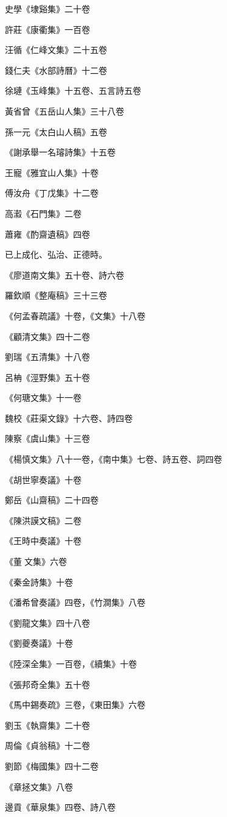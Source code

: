 史學《埭谿集》二十卷

許莊《康衢集》一百卷

汪循《仁峰文集》二十五卷

錢仁夫《水部詩曆》十二卷

徐璉《玉峰集》十五卷、五言詩五卷

黃省曾《五岳山人集》三十八卷

孫一元《太白山人稿》五卷

《謝承舉一名璿詩集》十五卷

王寵《雅宜山人集》十卷

傅汝舟《丁戊集》十二卷

高瀫《石門集》二卷

蕭雍《酌齋遺稿》四卷

已上成化、弘治、正德時。

《廖道南文集》五十卷、詩六卷

羅欽順《整庵稿》三十三卷

《何孟春疏議》十卷，《文集》十八卷

《顧清文集》四十二卷

劉瑞《五清集》十八卷

呂柟《涇野集》五十卷

《何瑭文集》十一卷

魏校《莊渠文錄》十六卷、詩四卷

陳察《虞山集》十三卷

《楊慎文集》八十一卷，《南中集》七卷、詩五卷、詞四卷

《胡世寧奏議》十卷

鄭岳《山齋稿》二十四卷

《陳洪謨文稿》二卷

《王時中奏議》十卷

《董文集》六卷

《秦金詩集》十卷

《潘希曾奏議》四卷，《竹澗集》八卷

《劉龍文集》四十八卷

《劉夔奏議》十卷

《陸深全集》一百卷，《續集》十卷

《張邦奇全集》五十卷

《馬中錫奏疏》三卷，《東田集》六卷

劉玉《執齋集》二十卷

周倫《貞翁稿》十二卷

劉節《梅國集》四十二卷

《章拯文集》八卷

邊貢《華泉集》四卷、詩八卷

